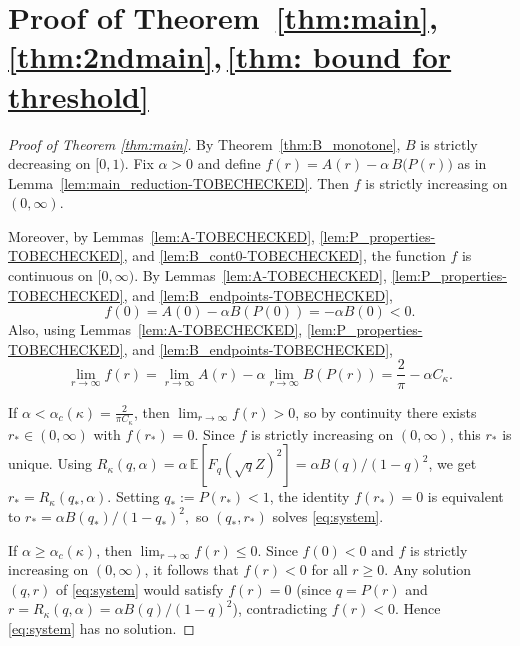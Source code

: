 \documentclass[11pt]{article}
\begin{document}
\section{Proof of Theorem~\ref{thm:main},\,\ref{thm:2ndmain},\,\ref{thm: bound for threshold}}
\begin{proof}[Proof of Theorem \ref{thm:main}]
By Theorem~\ref{thm:B_monotone}, $B$ is strictly decreasing on $[0,1)$. Fix $\alpha>0$ and define $f(r)=A(r)-\alpha\,B\bigl(P(r)\bigr)$ as in Lemma~\ref{lem:main_reduction-TOBECHECKED}. Then $f$ is strictly increasing on $(0,\infty)$.

Moreover, by Lemmas~\ref{lem:A-TOBECHECKED}, \ref{lem:P_properties-TOBECHECKED}, and \ref{lem:B_cont0-TOBECHECKED}, the function $f$ is continuous on $[0,\infty)$. By Lemmas~\ref{lem:A-TOBECHECKED}, \ref{lem:P_properties-TOBECHECKED}, and \ref{lem:B_endpoints-TOBECHECKED},
\[
f(0)=A(0)-\alpha B(P(0))=-\alpha B(0)<0.
\]
Also, using Lemmas~\ref{lem:A-TOBECHECKED}, \ref{lem:P_properties-TOBECHECKED}, and \ref{lem:B_endpoints-TOBECHECKED},
\[
\lim_{r\to\infty}f(r)=\lim_{r\to\infty}A(r)-\alpha\lim_{r\to\infty}B(P(r))
=\frac{2}{\pi}-\alpha C_{\kappa}.
\]

If $\alpha<\alpha_c(\kappa)=\frac{2}{\pi C_{\kappa}}$, then $\lim_{r\to\infty}f(r)>0$, so by continuity there exists $r_*\in(0,\infty)$ with $f(r_*)=0$. Since $f$ is strictly increasing on $(0,\infty)$, this $r_*$ is unique. Using $R_\kappa(q,\alpha)=\alpha\,\mathbb E[F_q(\sqrt q Z)^2]=\alpha B(q)/(1-q)^2$, we get $r_*=R_\kappa(q_*,\alpha)$.
 Setting $q_*:=P(r_*)<1$, the identity $f(r_*)=0$ is equivalent to
\(
r_*=\alpha B(q_*)/(1-q_*)^2,
\)
so $(q_*,r_*)$ solves \eqref{eq:system}.

If $\alpha\ge \alpha_c(\kappa)$, then $\lim_{r\to\infty}f(r)\le 0$. Since $f(0)<0$ and $f$ is strictly increasing on $(0,\infty)$, it follows that $f(r)<0$ for all $r\ge 0$. Any solution $(q,r)$ of \eqref{eq:system} would satisfy $f(r)=0$ (since $q=P(r)$ and $r=R_\kappa(q,\alpha)=\alpha B(q)/(1-q)^2$), contradicting $f(r)<0$. Hence \eqref{eq:system} has no solution.

\end{proof}
\end{document}
